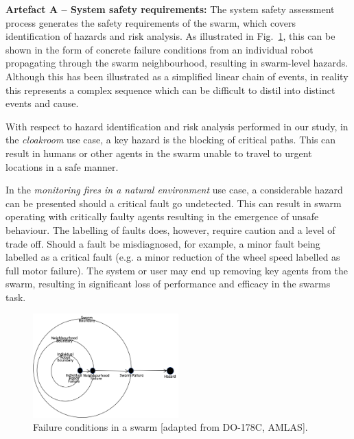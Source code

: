 \documentclass[lettersize,journal]{IEEEtran}
\begin{document}
\noindent \textbf{Artefact A -- System safety requirements: }
The system safety assessment process generates the safety requirements of the swarm, which covers identification of hazards and risk analysis. 
As illustrated in Fig.~\ref{failure-events}, this can be shown in the form of concrete failure conditions from an individual robot propagating through the swarm neighbourhood, resulting in swarm-level hazards. 
Although this has been illustrated as a simplified linear chain of events, in reality this represents a complex sequence which can be difficult to distil into distinct events and cause.

With respect to hazard identification and risk analysis performed in our study, in the \textit{cloakroom} use case, a key hazard is the blocking of critical paths. 
This can result in humans or other agents in the swarm unable to travel to urgent locations in a safe manner. 

In the \textit{monitoring fires in a natural environment} use case, a considerable hazard can be presented should a critical fault go undetected. This can result in swarm operating with critically faulty agents resulting in the emergence of unsafe behaviour. The labelling of faults does, however, require caution and a level of trade off. Should a fault be misdiagnosed, for example, a minor fault being labelled as a critical fault (e.g. a minor reduction of the wheel speed labelled as full motor failure). The system or user may end up removing key agents from the swarm, resulting in significant loss of performance and efficacy in the swarms task.\\ 

\begin{figure}[!t]
	\centering
	\includegraphics[width=0.5\textwidth]{figures/stage1-failureevents.png}
	\caption{Failure conditions in a swarm [adapted from DO-178C, AMLAS].}
	\label{failure-events}
\end{figure}
\end{document}
